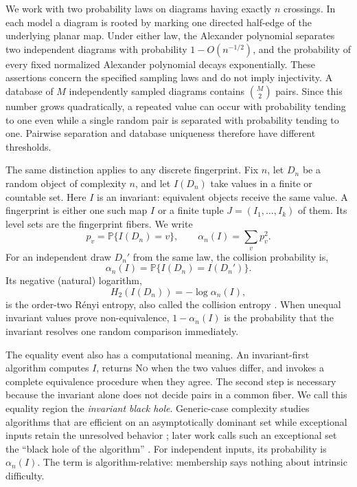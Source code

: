 \documentclass[9pt,twoside]{pnas-new}
\theoremstyle{definition}
\theoremstyle{remark}
\renewcommand{\Pr}{\mathbb{P}}
\begin{document}
We work with two probability laws on diagrams having exactly $n$ crossings. In each model a diagram is rooted by marking one directed half-edge of the underlying planar map. Under either law, the Alexander polynomial separates two independent diagrams with probability $1-O(n^{-1/2})$, and the probability of every fixed normalized Alexander polynomial decays exponentially. These assertions concern the specified sampling laws and do not imply injectivity. A database of $M$ independently sampled diagrams contains $\binom{M}{2}$ pairs. Since this number grows quadratically, a repeated value can occur with probability tending to one even while a single random pair is separated with probability tending to one. Pairwise separation and database uniqueness therefore have different thresholds.

The same distinction applies to any discrete fingerprint. Fix $n$, let $D_n$ be a random object of complexity $n$, and let $I(D_n)$ take values in a finite or countable set.  Here $I$ is an invariant: equivalent objects receive the same value. A fingerprint is either one such map $I$ or a finite tuple $J=(I_1,\ldots,I_k)$ of them. Its level sets are the fingerprint fibers. We write
\begin{equation}
 p_v=\Pr\{I(D_n)=v\},
 \qquad
 \alpha_n(I)=\sum_v p_v^2.
 \label{eq:opening-alpha}
\end{equation}
For an independent draw $D_n'$ from the same law, the collision probability is,
\[
 \alpha_n(I)=\Pr\{I(D_n)=I(D_n')\}.
\]
Its negative (natural) logarithm,
\[
 H_2(I(D_n))=-\log\alpha_n(I),
\]
is the order-two R\'enyi entropy, also called the collision entropy \cite{renyi1961}.  When unequal invariant values prove non-equivalence, $1-\alpha_n(I)$ is the probability that the invariant resolves one random comparison immediately.

The equality event also has a computational meaning. An invariant-first algorithm computes $I$, returns \textsc{No} when the two values differ, and invokes a complete equivalence procedure when they agree. The second step is necessary because the invariant alone does not decide pairs in a common fiber. We call this equality region the \emph{invariant black hole}. Generic-case complexity studies algorithms that are efficient on an asymptotically dominant set while exceptional inputs retain the unresolved behavior \cite{kapovichetal2003,gilmanetal2007,hamkinsmiasnikov2006,myasnikovrybalov2008}; later work calls such an exceptional set the ``black hole of the algorithm'' \cite{rybalov2013}. For independent inputs, its probability is $\alpha_n(I)$. The term is algorithm-relative: membership says nothing about intrinsic difficulty.
\end{document}
